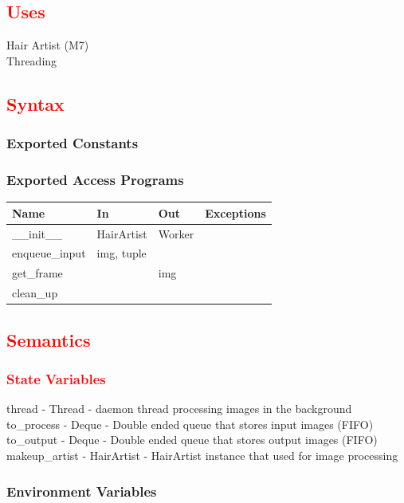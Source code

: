 \documentclass[12pt, titlepage]{article}
\begin{document}
\subsection{\textcolor{red}{Uses}}
Hair Artist (M7) \\
Threading

\subsection{\textcolor{red}{Syntax}}

\subsubsection{Exported Constants}
\subsubsection{Exported Access Programs}

\begin{center}
\begin{tabular}{p{4cm} p{3cm} p{4cm} p{4cm}}
\hline
\textbf{Name} & \textbf{In} & \textbf{Out} & \textbf{Exceptions} \\
\hline
\_\_init\_\_ & HairArtist & Worker & \\
enqueue\_input & img, tuple & &   \\
get\_frame & & img &  \\
clean\_up & & & \\
\hline
\end{tabular}
\end{center}

\subsection{\textcolor{red}{Semantics}}

\subsubsection{\textcolor{red}{State Variables}}
thread - Thread - daemon thread processing images in the background \\ 
to\_process - Deque - Double ended queue that stores input images (FIFO) \\ 
to\_output - Deque - Double ended queue that stores output images (FIFO) \\ 
makeup\_artist - HairArtist - HairArtist instance that used for image processing 

\subsubsection{Environment Variables}
\end{document}
